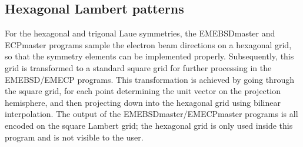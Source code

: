 \documentclass[DIV=calc, paper=letter, fontsize=11pt]{scrartcl}	 %
\begin{document}

\subsection{Hexagonal Lambert patterns \label{sec:hexagonal}}
For the hexagonal and trigonal Laue symmetries, the \textsf{EMEBSDmaster} and \textsf{ECPmaster} programs sample the electron beam directions on 
a hexagonal grid, so that the symmetry elements can be implemented properly.  Subsequently, this grid is transformed to a standard
square grid for further processing in the \textsf{EMEBSD}/\textsf{EMECP} programs.  This transformation is achieved by going through the square grid, 
for each point determining the unit vector on the projection hemisphere, and then projecting down into the hexagonal grid using 
bilinear interpolation.  The output of the \textsf{EMEBSDmaster}/\textsf{EMECPmaster} programs is all encoded on the square Lambert grid; the hexagonal
grid is only used inside this program and is not visible to the user.
\end{document}
